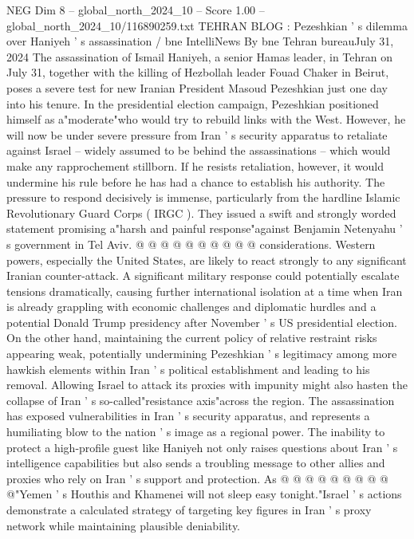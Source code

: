 \begin{textsample}{NEG Dim 8 – global\_north\_2024\_10 – Score 1.00 – global\_north\_2024\_10/116890259.txt}  \label{ex:f8_neg_203}
TEHRAN BLOG : Pezeshkian ' s dilemma over Haniyeh ' s assassination / bne IntelliNews By bne Tehran bureauJuly 31, 2024 The assassination of Ismail Haniyeh, a senior Hamas leader, in Tehran on July 31, together with the killing of Hezbollah leader Fouad Chaker in Beirut, poses a severe test for new Iranian President Masoud Pezeshkian just one day into his tenure.
In the presidential election campaign, Pezeshkian positioned himself as a"moderate"who would try to rebuild links with the West.
However, he will now be under severe pressure from Iran ' s security apparatus to retaliate against Israel -- widely assumed to be behind the assassinations -- which would make any rapprochement stillborn.
If he resists retaliation, however, it would undermine his rule before he has had a chance to establish his authority.
The pressure to respond decisively is immense, particularly from the hardline Islamic Revolutionary Guard Corps ( IRGC ).
They issued a swift and strongly worded statement promising a"harsh and painful response"against Benjamin Netenyahu ' s government in Tel Aviv. @ @ @ @ @ @ @ @ @ @ considerations.
Western powers, especially the United States, are likely to react strongly to any significant Iranian counter-attack.
A significant military response could potentially escalate tensions dramatically, causing further international isolation at a time when Iran is already grappling with economic challenges and diplomatic hurdles and a potential Donald Trump presidency after November ' s US presidential election.
On the other hand, maintaining the current policy of relative restraint risks appearing weak, potentially undermining Pezeshkian ' s legitimacy among more hawkish elements within Iran ' s political establishment and leading to his removal.
Allowing Israel to attack its proxies with impunity might also hasten the collapse of Iran ' s so-called"resistance axis"across the region.
The assassination has exposed vulnerabilities in Iran ' s security apparatus, and represents a humiliating blow to the nation ' s image as a regional power.
The inability to protect a high-profile guest like Haniyeh not only raises questions about Iran ' s intelligence capabilities but also sends a troubling message to other allies and proxies who rely on Iran ' s support and protection.
As @ @ @ @ @ @ @ @ @ @"Yemen ' s Houthis and Khamenei will not sleep easy tonight."Israel ' s actions demonstrate a calculated strategy of targeting key figures in Iran ' s proxy network while maintaining plausible deniability.

\end{textsample}
